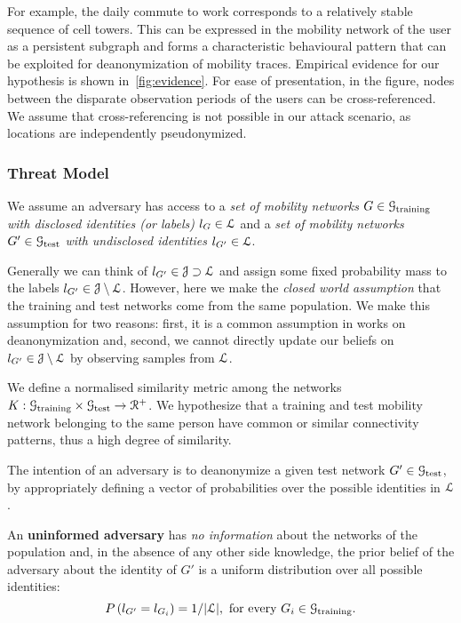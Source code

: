 For example, the daily commute to work corresponds to a relatively stable sequence of cell towers.
This can be expressed in the mobility network of the user as a persistent subgraph and forms a characteristic behavioural pattern that can be exploited for deanonymization of mobility traces.
Empirical evidence for our hypothesis is shown in~\cref{fig:evidence}.
For ease of presentation, in the figure, nodes between the disparate observation periods of the users can be cross-referenced. We assume that cross-referencing is not possible in our attack scenario, as locations are independently pseudonymized.

\subsubsection{Threat Model \label{sec:threat-model}}

We assume an adversary has access to a \emph{set of mobility networks} $ G \in \mathcal{G}_{\text{training}} $ \emph{with disclosed identities (or labels)} $l_{G} \in \mathcal{L}$
and a \emph{set of mobility networks} $ G' \in \mathcal{G}_{\text{test}} $ \emph{with undisclosed identities}
$ l_{G'} \in \mathcal{L}$.%

{Generally we can think of $ l_{G'} \in \mathcal{J} \supset \mathcal{L}$ and assign some fixed probability mass to the labels $ l_{G'} \in \mathcal{J} \setminus \mathcal{L}$.
However, here we make the \emph{closed world assumption} that the training and test networks come from the same population.
We make this assumption for two reasons: first, it is a common assumption in works on deanonymization and, second, we cannot directly update our beliefs on $ l_{G'} \in \mathcal{J} \setminus \mathcal{L}$ by observing samples from $ \mathcal{L}$. }

We define a normalised similarity metric among the networks $ K: \mathcal{G}_{\text{training}} \times \mathcal{G}_{\text{test}} \rightarrow \mathcal{R}^+ $.
We hypothesize that a training and test mobility network belonging to the same person have common or similar connectivity patterns, thus a high degree of similarity.

The intention of an adversary is to deanonymize a given test network $ G' \in \mathcal{G}_{\text{test}} $, by appropriately defining a vector of probabilities over the possible identities in $ \mathcal{L}$.

An \textbf{uninformed adversary} has \emph{no information} about the networks of the population and, in the absence of any other side knowledge, the prior belief of the adversary about the identity of $ G' $ is a uniform distribution over all possible identities:
\[
	P\left(l_{G'}= l_{G_i}\right) = 1/|\mathcal{L}|, \mbox{ for every }  G_i \in \mathcal{G}_{\text{training}}.
\]

